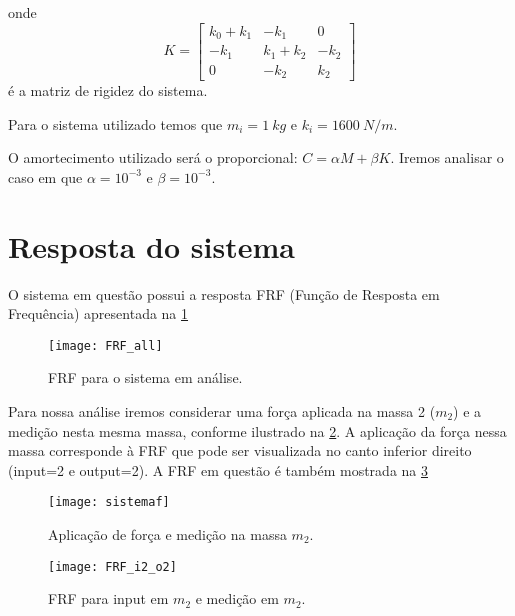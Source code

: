 onde
\begin{equation*}
K = 
\begin{bmatrix} 
k_0 +k_1 & -k_1 & 0\\
-k_1 & k_1+k_2 & -k_2 \\
0 & -k_2 & k_2
\end{bmatrix}
\end{equation*}   
é a matriz de rigidez do sistema.

Para o sistema utilizado temos que $m_i = 1 \ kg$ e $k_i = 1600 \ N/m$.

O amortecimento utilizado será o proporcional: $C = \alpha M + \beta K$. Iremos analisar o caso em que $\alpha = 10^{-3}$ e $\beta = 10^{-3}$.

\section{Resposta do sistema}

O sistema em questão possui a resposta  FRF (Função de Resposta em Frequência) apresentada na \cref{fig:FRF_all}

\begin{figure}[!h]
	\centering
	\texttt{[image: FRF\_all]}
	\caption{FRF para o sistema em análise.}
	\label{fig:FRF_all}
\end{figure}

Para nossa análise iremos considerar uma força aplicada na massa 2 ($m_2$) e a medição nesta mesma massa, conforme ilustrado na \cref{fig:sistemaf}. A aplicação da força nessa massa corresponde à FRF que pode ser visualizada no canto inferior direito (input=2 e output=2). A FRF em questão é também mostrada na \cref{fig:FRF_i2_o2}

\begin{figure}
	\centering
	\texttt{[image: sistemaf]}
	\caption{Aplicação de força e medição na massa $m_2$.}
	\label{fig:sistemaf}
\end{figure}

\begin{figure}
	\centering
	\texttt{[image: FRF\_i2\_o2]}
	\caption{FRF para input em $m_2$ e medição em $m_2$.}
	\label{fig:FRF_i2_o2}
\end{figure}



